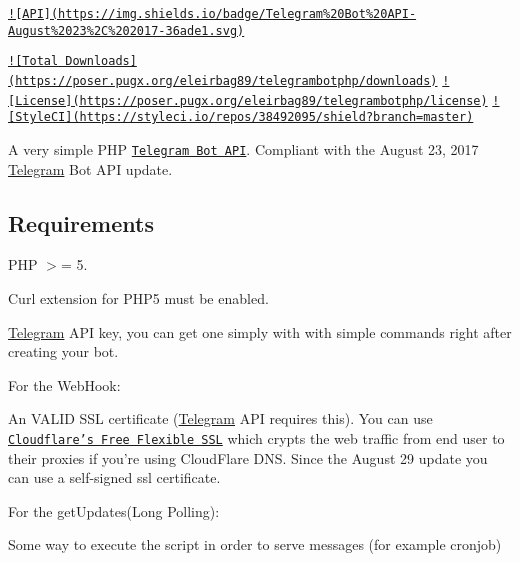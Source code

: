 \href{https://core.telegram.org/bots/api}{\tt !\mbox{[}A\-P\-I\mbox{]}(https\-://img.\-shields.\-io/badge/\-Telegram\%20\-Bot\%20\-A\-P\-I-\/\-August\%2023\%2\-C\%202017-\/36ade1.\-svg)}  

\href{https://packagist.org/packages/eleirbag89/telegrambotphp}{\tt !\mbox{[}Total Downloads\mbox{]}(https\-://poser.\-pugx.\-org/eleirbag89/telegrambotphp/downloads)} \href{https://packagist.org/packages/eleirbag89/telegrambotphp}{\tt !\mbox{[}License\mbox{]}(https\-://poser.\-pugx.\-org/eleirbag89/telegrambotphp/license)} \href{https://styleci.io/repos/38492095}{\tt !\mbox{[}Style\-C\-I\mbox{]}(https\-://styleci.\-io/repos/38492095/shield?branch=master)}

A very simple P\-H\-P \href{https://core.telegram.org/bots}{\tt Telegram Bot A\-P\-I}. Compliant with the August 23, 2017 \hyperlink{class_telegram}{Telegram} Bot A\-P\-I update.

\subsection*{Requirements }


\begin{DoxyItemize}
\item P\-H\-P $>$= 5.
\item Curl extension for P\-H\-P5 must be enabled.
\item \hyperlink{class_telegram}{Telegram} A\-P\-I key, you can get one simply with \href{https://core.telegram.org/bots#botfather}{\tt } with simple commands right after creating your bot.
\end{DoxyItemize}

For the Web\-Hook\-:
\begin{DoxyItemize}
\item An V\-A\-L\-I\-D S\-S\-L certificate (\hyperlink{class_telegram}{Telegram} A\-P\-I requires this). You can use \href{https://www.cloudflare.com/ssl}{\tt Cloudflare's Free Flexible S\-S\-L} which crypts the web traffic from end user to their proxies if you're using Cloud\-Flare D\-N\-S. Since the August 29 update you can use a self-\/signed ssl certificate.
\end{DoxyItemize}

For the get\-Updates(\-Long Polling)\-:
\begin{DoxyItemize}
\item Some way to execute the script in order to serve messages (for example cronjob)
\end{DoxyItemize}

